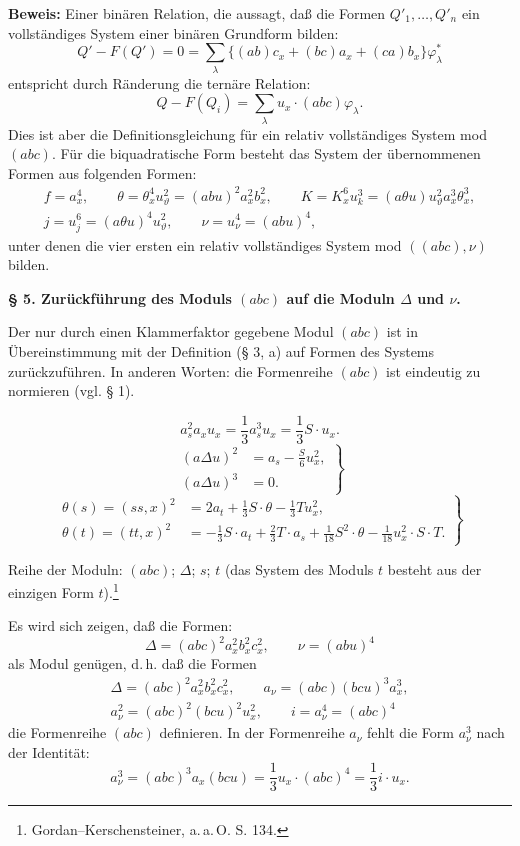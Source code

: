 \documentclass[11pt]{article}
\newcommand{\A}{\Delta}
\begin{document}
\noindent\textbf{Beweis:}
Einer binären Relation, die aussagt, daß die Formen $Q'_1,\ldots,Q'_n$ ein vollständiges System einer binären Grundform bilden:
\[
Q'-F(Q')=0=\sum_\lambda\bigl\{(ab)c_x+(bc)a_x+(ca)b_x\bigr\}\varphi_\lambda^{*}
\]
entspricht durch Ränderung die ternäre Relation:
\[
Q-F(Q_i)=\sum_\lambda u_x\cdot(abc)\varphi_\lambda .
\]
Dies ist aber die Definitionsgleichung für ein relativ vollständiges System mod $(abc)$. Für die biquadratische Form besteht das System der übernommenen Formen aus folgenden Formen:
\[
\begin{gathered}
f=a_x^4,\qquad
\theta=\theta_x^4u_\vartheta^2=(abu)^2a_x^2b_x^2,\qquad
K=K_x^6u_k^3=(a\theta u)u_\vartheta^2a_x^3\theta_x^3,\\
j=u_j^6=(a\theta u)^4u_\vartheta^2,\qquad
\nu=u_\nu^4=(abu)^4,
\end{gathered}
\]
unter denen die vier ersten ein relativ vollständiges System mod $((abc),\nu)$ bilden.

\begin{center}
\textbf{§ 5. \quad Zurückführung des Moduls $(abc)$ auf die Moduln $\A$ und $\nu$.}
\end{center}

Der nur durch einen Klammerfaktor gegebene Modul $(abc)$ ist in Übereinstimmung mit der Definition (§ 3, a) auf Formen des Systems zurückzuführen. In anderen Worten: die Formenreihe $(abc)$ ist eindeutig zu normieren (vgl. § 1).

\[
a_s^2a_xu_x=\frac13 a_s^3u_x=\frac13 S\cdot u_x. \tag{2}
\]
\[
\left.
\begin{aligned}
(a\A u)^2&=a_s-\frac{S}{6}u_x^2,\\
(a\A u)^3&=0.
\end{aligned}
\right\} \tag{3}
\]
\[
\left.
\begin{aligned}
\theta(s)=(ss,x)^2&=2a_t+\frac13 S\cdot\theta-\frac13 Tu_x^2,\\
\theta(t)=(tt,x)^2&=-\frac13 S\cdot a_t+\frac23 T\cdot a_s+\frac1{18}S^2\cdot\theta-\frac1{18}u_x^2\cdot S\cdot T.
\end{aligned}
\right\} \tag{4}
\]

Reihe der Moduln: $(abc)$; $\A$; $s$; $t$ (das System des Moduls $t$ besteht aus der einzigen Form $t$).\footnote{Gordan--Kerschensteiner, a.\,a.\,O. S. 134.}

Es wird sich zeigen, daß die Formen:
\[
\A=(abc)^2a_x^2b_x^2c_x^2,\qquad \nu=(abu)^4
\]
als Modul genügen, d.\,h. daß die Formen
\[
\begin{gathered}
\A=(abc)^2a_x^2b_x^2c_x^2,\qquad
a_\nu=(abc)(bcu)^3a_x^3,\\
a_\nu^2=(abc)^2(bcu)^2u_x^2,\qquad
i=a_\nu^4=(abc)^4
\end{gathered}
\]
die Formenreihe $(abc)$ definieren. In der Formenreihe $a_\nu$ fehlt die Form $a_\nu^3$ nach der Identität:
\[
a_\nu^3=(abc)^3a_x(bcu)=\frac13 u_x\cdot(abc)^4=\frac13 i\cdot u_x.
\]
\end{document}
